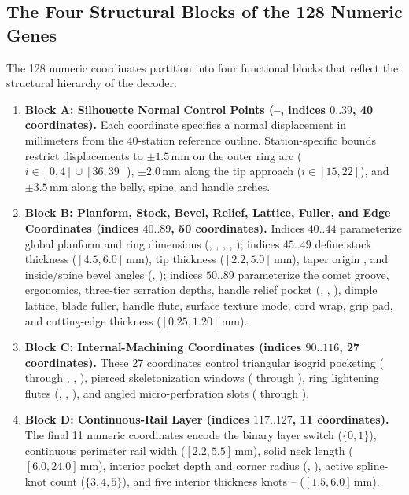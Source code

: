 \subsection{The Four Structural Blocks of the 128 Numeric Genes}
The 128 numeric coordinates partition into four functional blocks that reflect the structural hierarchy of the decoder:
\begin{enumerate}[leftmargin=*,nosep]
\item \textbf{Block A: Silhouette Normal Control Points (--, indices $0..39$, 40 coordinates).} Each coordinate specifies a normal displacement in millimeters from the 40-station reference outline. Station-specific bounds restrict displacements to $\pm 1.5\,\mathrm{mm}$ on the outer ring arc ($i\in[0,4]\cup[36,39]$), $\pm 2.0\,\mathrm{mm}$ along the tip approach ($i\in[15,22]$), and $\pm 3.5\,\mathrm{mm}$ along the belly, spine, and handle arches.
\item \textbf{Block B: Planform, Stock, Bevel, Relief, Lattice, Fuller, and Edge Coordinates (indices $40..89$, 50 coordinates).} Indices $40..44$ parameterize global planform and ring dimensions (, , , , ); indices $45..49$ define stock thickness  ($[4.5,6.0]\,\mathrm{mm}$), tip thickness  ($[2.2,5.0]\,\mathrm{mm}$), taper origin , and inside/spine bevel angles (, ); indices $50..89$ parameterize the comet groove, ergonomics, three-tier serration depths, handle relief pocket (, , ), dimple lattice, blade fuller, handle flute, surface texture mode, cord wrap, grip pad, and cutting-edge thickness  ($[0.25,1.20]\,\mathrm{mm}$).
\item \textbf{Block C: Internal-Machining Coordinates (indices $90..116$, 27 coordinates).} These 27 coordinates control triangular isogrid pocketing ( through , , ), pierced skeletonization windows ( through ), ring lightening flutes (, , ), and angled micro-perforation slots ( through ).
\item \textbf{Block D: Continuous-Rail Layer (indices $117..127$, 11 coordinates).} The final 11 numeric coordinates encode the binary layer switch  ($\{0,1\}$), continuous perimeter rail width  ($[2.2,5.5]\,\mathrm{mm}$), solid neck length  ($[6.0,24.0]\,\mathrm{mm}$), interior pocket depth and corner radius (, ), active spline-knot count  ($\{3,4,5\}$), and five interior thickness knots -- ($[1.5,6.0]\,\mathrm{mm}$).
\end{enumerate}

